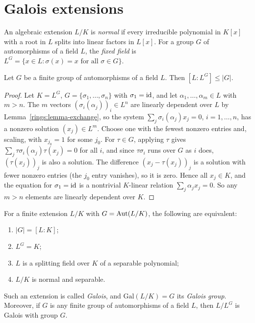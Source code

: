 \section{Galois extensions}\label{fields:section-galois}

\begin{definition}\label{fields:definition-normal}
An algebraic extension $L/K$ is \emph{normal} if every irreducible polynomial in $K[x]$
with a root in $L$ splits into linear factors in $L[x]$. For a group $G$ of automorphisms
of a field $L$, the \emph{fixed field} is $L^G = \{x \in L : \sigma(x) = x \text{ for all } \sigma \in G\}$.
\end{definition}

\begin{lemma}[Artin]\label{fields:lemma-artin}
Let $G$ be a finite group of automorphisms of a field $L$. Then $[L : L^G] \leq |G|$.
\end{lemma}

\begin{proof}
Let $K = L^G$, $G = \{\sigma_1, \ldots, \sigma_n\}$ with $\sigma_1 = \mathrm{id}$, and let
$\alpha_1, \ldots, \alpha_m \in L$ with $m > n$. The $m$ vectors $(\sigma_i(\alpha_j))_i \in L^n$ are linearly
dependent over $L$ by Lemma~\ref{rings:lemma-exchange}, so the system
$\sum_j \sigma_i(\alpha_j) x_j = 0$, $i = 1, \ldots, n$, has a nonzero solution $(x_j) \in L^m$. Choose
one with the fewest nonzero entries and, scaling, with $x_{j_0} = 1$ for some $j_0$. For
$\tau \in G$, applying $\tau$ gives $\sum_j \tau\sigma_i(\alpha_j)\tau(x_j) = 0$ for all $i$, and since
$\tau\sigma_i$ runs over $G$ as $i$ does, $(\tau(x_j))_j$ is also a solution. The difference
$(x_j - \tau(x_j))_j$ is a solution with fewer nonzero entries (the $j_0$ entry vanishes), so it
is zero. Hence all $x_j \in K$, and the equation for $\sigma_1 = \mathrm{id}$ is a nontrivial $K$-linear
relation $\sum_j \alpha_j x_j = 0$. So any $m > n$ elements are linearly dependent over $K$.
\end{proof}

\begin{theorem}\label{fields:theorem-galois-characterisation}
For a finite extension $L/K$ with $G = \operatorname{Aut}(L/K)$, the following are equivalent:
\begin{enumerate}
\item $|G| = [L : K]$;
\item $L^G = K$;
\item $L$ is a splitting field over $K$ of a separable polynomial;
\item $L/K$ is normal and separable.
\end{enumerate}
Such an extension is called \emph{Galois}, and $\mathrm{Gal}(L/K) = G$ its \emph{Galois group}.
Moreover, if $G$ is any finite group of automorphisms of a field $L$, then $L/L^G$ is Galois
with group $G$.
\end{theorem}

